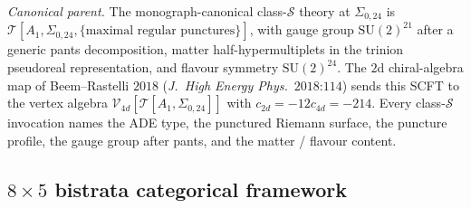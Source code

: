 \begin{theorem}
\emph{Canonical parent.} The monograph-canonical class-$\mathcal{S}$ theory at
$\Sigma_{0, 24}$ is $\mathcal{T}[A_1, \Sigma_{0, 24}, \{\text{maximal
regular punctures}\}]$, with gauge group $\mathrm{SU}(2)^{21}$ after
a generic pants decomposition, matter half-hypermultiplets in the
trinion pseudoreal representation, and flavour symmetry
$\mathrm{SU}(2)^{24}$. The $2$d chiral-algebra map of Beem--Rastelli
$2018$ (\emph{J.~High Energy Phys.}~$2018$:$114$) sends this SCFT to
the vertex algebra $\mathcal{V}_{4d}[\mathcal{T}[A_1, \Sigma_{0, 24}]]$
with $c_{2d} = -12 c_{4d} = -214$. Every class-$\mathcal{S}$
invocation names the ADE type, the punctured Riemann surface, the
puncture profile, the gauge group after pants, and the matter / flavour
content.
\end{theorem}

\subsection{$8\times 5$ bistrata categorical framework}
\label{wn:subsec:third-pass-bistrata}

